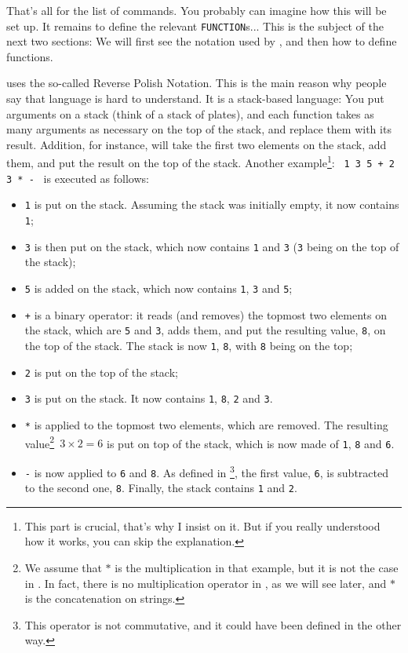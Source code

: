That's all for the list of commands. You probably can imagine how this will be
set up. It remains to define the relevant \texttt{FUNCTION}{}s... This is the
subject of the next two sections: We will first see the notation used by \bt,
and then how to define functions. 


\bt uses the so-called Reverse Polish Notation. This is the main reason why
people say that \bt language is hard to understand. It is a stack-based
language: You put arguments on a stack (think of a stack of plates), and each
function takes as many arguments as necessary on the top of the stack, and
replace them with its result. Addition, for instance, will take the first two
elements on the stack, add them, and put the result on the top of the stack.
Another example\footnote{This part is crucial, that's why I insist on it. 
  But if you really understood how it works,
  you can skip the explanation.}: \verb/ 1 3 5 + 2 3 * - / is executed as
follows: 
\begin{itemize}
\item \verb+1+ is put on the stack. Assuming the stack was initially empty, it
  now contains \verb+1+;
\item \verb+3+ is then put on the stack, which now contains 
\verb+1+ and \verb+3+ (\verb+3+ being on the top of the stack);
\item \verb+5+ is added on the stack, which now contains \verb+1+, \verb+3+
  and \verb+5+;
\item \verb/+/ is a binary operator: it reads (and removes) the topmost two
  elements on the 
  stack, which are \verb+5+ and \verb+3+, adds them, and put the resulting
  value, \verb+8+, on the top of the stack. The stack is now \verb+1+,
  \verb+8+, with \verb+8+ being on the top;
\item \verb+2+ is put on the top of the stack;
\item \verb+3+ is put on the stack. It now contains \verb+1+, \verb+8+,
  \verb+2+ and \verb+3+. 
\item \verb+*+ is applied to the topmost two elements, which are removed. 
The resulting value\footnote{We assume that $\mathtt *$ is the
  multiplication in that example, but it is not the case in \bt. In fact,
  there is no multiplication operator in \bt, as we will see later, and
  $\mathtt{*}$ is the concatenation on strings.}~$3\times 2=6$
is put on top of the stack, which is now made of \verb+1+, \verb+8+ and
\verb+6+. 
\item \verb+-+ is now applied to \verb+6+ and \verb+8+. As defined in
  \bt\footnote{This operator is not commutative, and it could have been
  defined in the other way.}, the
  first value, \verb+6+, is subtracted to the second one, \verb+8+.
  Finally, the stack contains \verb+1+ and \verb+2+.
\end{itemize}

